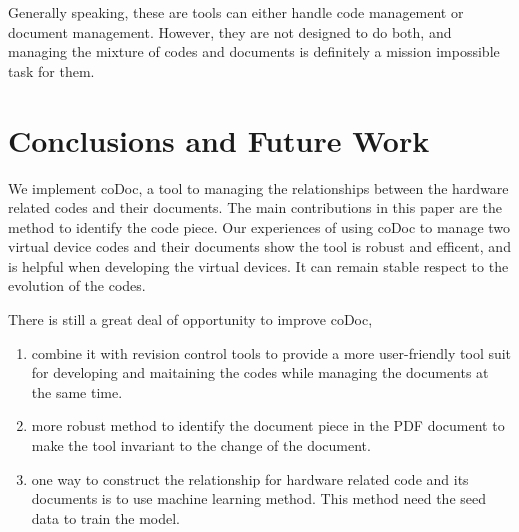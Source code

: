\documentclass[11pt,letterpaper,oneside]{article}
\begin{document}
Generally speaking, these are tools can either handle code management or document management.
However, they are not designed to do both,
and managing the mixture of codes and documents is definitely a mission impossible task for them.


\section{Conclusions and Future Work}
\label{sec:conclusion}
We implement coDoc, 
a tool to managing the relationships between the hardware related codes and their documents.
The main contributions in this paper are the method to identify the code piece.
Our experiences of using coDoc to manage two virtual device codes and their documents show the tool is robust and efficent,
and is helpful when developing the virtual devices.
It can remain stable respect to the evolution of the codes.

There is still a great deal of opportunity to improve coDoc, 
\begin{enumerate}
\item combine it with revision control tools to provide a more user-friendly tool suit for developing and maitaining the codes while managing the documents at the same time.
\item more robust method to identify the document piece in the PDF document to make the tool invariant to the change of the document.
\item one way to construct the relationship for hardware related code and its documents is to use machine learning method.
This method need the seed data to train the model.
\end{enumerate}






\end{document}

